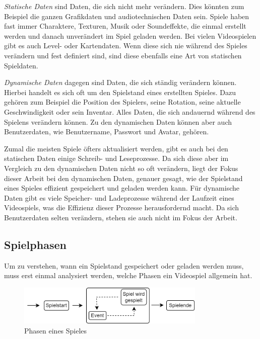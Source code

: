 \textit{Statische Daten} sind Daten, die sich nicht mehr verändern. Dies könnten zum Beispiel die ganzen Grafikdaten und audiotechnischen Daten sein. Spiele haben fast immer Charaktere, Texturen, Musik oder Soundeffekte, die einmal erstellt werden und danach unverändert im Spiel geladen werden. Bei vielen Videospielen gibt es auch Level- oder Kartendaten. Wenn diese sich nie während des Spieles verändern und fest definiert sind, sind diese ebenfalls eine Art von statischen Spieldaten. 

\textit{Dynamische Daten} dagegen sind Daten, die sich ständig verändern können. Hierbei handelt es sich oft um den Spielstand eines erstellten Spieles. Dazu gehören zum Beispiel die Position des Spielers, seine Rotation, seine aktuelle Geschwindigkeit oder sein Inventar. Alles Daten, die sich andauernd während des Spielens verändern können. Zu den dynamischen Daten können aber auch Benutzerdaten, wie Benutzername, Passwort und Avatar, gehören. 

Zumal die meisten Spiele öfters aktualisiert werden, gibt es auch bei den statischen Daten einige Schreib- und Leseprozesse.\cite{lin2017studying} Da sich diese aber im Vergleich zu den dynamischen Daten nicht so oft verändern, liegt der Fokus dieser Arbeit bei den dynamischen Daten, genauer gesagt, wie der Spielstand eines Spieles effizient gespeichert und geladen werden kann. Für dynamische Daten gibt es viele Speicher- und Ladeprozesse während der Laufzeit eines Videospiels, was die Effizienz dieser Prozesse herausfordernd macht. Da sich Benutzerdaten selten verändern, stehen sie auch nicht im Fokus der Arbeit. 


\subsection{Spielphasen} \label{ssect:spielphasen}
Um zu verstehen, wann ein Spielstand gespeichert oder geladen werden muss, muss erst einmal analysiert werden, welche Phasen ein Videospiel allgemein hat.

\begin{figure}[htp]
    \centering
    \includegraphics[width=0.8\textwidth]{images/Spielphasen.png}
    \caption{Phasen eines Spieles}
    \label{fig:spielphasen}
\end{figure}

